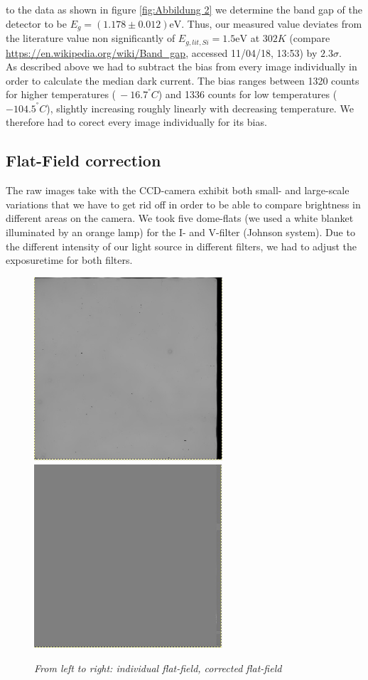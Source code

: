  to the data as shown in figure \ref{fig:Abbildung 2} we determine the band gap of the detector to be $E_g = \left(1.178\pm0.012\right)\mathrm{eV}$. Thus, our measured value deviates from the literature value non significantly of $E_{g,lit,Si}=1.5 \mathrm{eV}$ at $302 K$ (compare \url{https://en.wikipedia.org/wiki/Band_gap}, accessed 11/04/18, 13:53) by $2.3\sigma$.\\
As described above we had to subtract the bias from every image individually in order to calculate the median dark current. The bias ranges between 1320 counts for higher temperatures ($~ -16.7 ^{°}C$) and 1336 counts for low temperatures (~$-104.5^{°}C$), slightly increasing roughly linearly with decreasing temperature. We therefore had to corect every image individually for its bias.


\subsection{Flat-Field correction}
The raw images take with the CCD-camera exhibit both small- and large-scale variations that we have to get rid off in order to be able to compare brightness in different areas on the camera.  We took five dome-flats (we used a white blanket illuminated by an orange lamp) for the I- and V-filter (Johnson system). Due to the different intensity of our light source in different filters, we had to adjust the exposuretime for both filters.
\begin{figure}[h]
	\includegraphics[width=70mm]{flat}
	\includegraphics[width=70mm]{flat_norm}
	\centering
	\caption{ \itshape From left to right: individual flat-field, corrected flat-field }
	\label{fig:Abbildung 3}
\end{figure}
